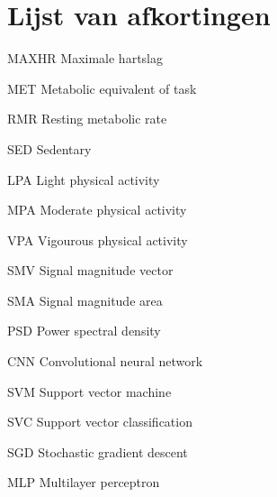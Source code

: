 \chapter*{Lijst van afkortingen}

\newcommand{\abbrlabel}[1]{\makebox[3cm][l]{\textbf{#1}\ }}
\newenvironment{abbreviations}{\begin{list}{}{\renewcommand{\makelabel}{\abbrlabel}}}{\end{list}}
\begin{abbreviations}
\item[MAXHR] Maximale hartslag
\item[MET] Metabolic equivalent of task
\item[RMR] Resting metabolic rate
\item[SED] Sedentary
\item[LPA] Light physical activity
\item[MPA] Moderate physical activity
\item[VPA] Vigourous physical activity
\item[SMV] Signal magnitude vector
\item[SMA] Signal magnitude area
\item[PSD] Power spectral density
\item[CNN] Convolutional neural network
\item[SVM] Support vector machine
\item[SVC] Support vector classification
\item[SGD] Stochastic gradient descent
\item[MLP] Multilayer perceptron 

\end{abbreviations}